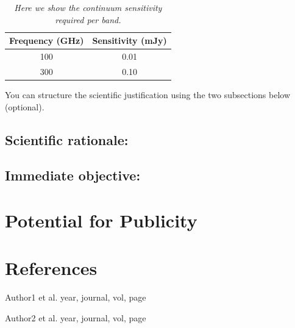 \documentclass{alma_proposal}
\begin{document}
\begin{table}[tbh]
\begin{center}
\caption[]{\em{Here we show the continuum sensitivity required per band.}}
\begin{tabular}{cc}
\hline \noalign {\smallskip}
Frequency (GHz) & Sensitivity (mJy) \\
\hline \noalign {\smallskip}
100 & 0.01 \\
300 & 0.10 \\
\end{tabular}
\end{center}
\end{table}

You can structure the scientific justification using the two subsections below (optional).

\subsection{Scientific rationale:}


\subsection{Immediate objective:}



\section{Potential for Publicity}




\section{References}


\noindent [1] Author1 et al. year, journal, vol, page

\noindent [2] Author2 et al. year, journal, vol, page


\end{document}
